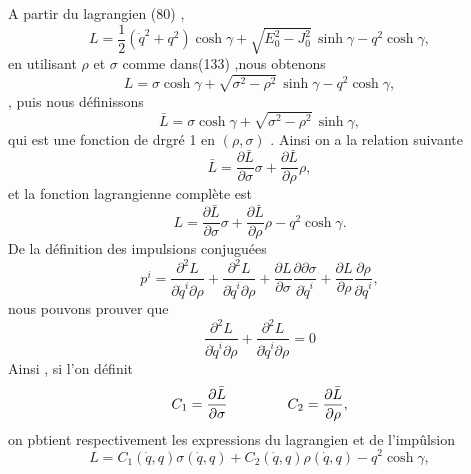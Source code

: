 \documentclass[12pt,a4paper, openany]{article}
\begin{document}
	   A partir du lagrangien (80) ,
	   \begin{equation}  
	   L=\frac{1}{2}\left(\dot{q}^{2}+q^{2}\right)\cosh{\gamma}+\sqrt{E^2_0-J_0^2}\,\sinh{\gamma}-q^{2}\cosh{\gamma},
	\end{equation}
	en utilisant $\rho$ et $\sigma$ comme dans(133) ,nous obtenons
	\begin{equation}  
		L=\sigma\cosh{\gamma}+\sqrt{\sigma^2-\rho^2}\,\sinh{\gamma}-q^{2}\cosh{\gamma},\end{equation},
		puis nous définissons 
		 \begin{equation}  
		 	\bar{L}=\sigma\cosh{\gamma}+\sqrt{\sigma^2-\rho^2}\,\sinh{\gamma},
		 \end{equation}
		 qui est une fonction de drgré 1 en $\left(\rho,\sigma\right)$ . Ainsi on a la relation suivante 
		 \begin{equation}
		 \bar{L}=\frac{\partial{\bar{L}}}{\partial{\sigma}}\sigma+\frac{\partial{\bar{L}}}{\partial{\rho}}\rho ,	
		 \end{equation}
		 et la fonction lagrangienne complète est 
		 \begin{equation}
		 L=\frac{\partial{\bar{L}}}{\partial{\sigma}}\sigma+\frac{\partial{\bar{L}}}{\partial{\rho}}\rho-q^{2}\cosh{\gamma} .	
		 \end{equation}
		 De la définition des impulsions conjuguées 
		 \begin{equation}
		 	p^i=\frac{\partial^{2}L}{\partial \dot{q}^i\partial\rho}+\frac{\partial^{2}L}{\partial \dot{q}^i\partial\rho}+\frac{\partial L}{\partial \sigma}\frac{\partial \partial \sigma}{\partial \dot{q}^i}+\frac{\partial L}{\partial \rho}\frac{\partial \rho}{\partial \dot{q}^i} ,
		 \end{equation}
		 nous pouvons prouver que
		 \begin{equation}
		 \frac{\partial^{2}L}{\partial \dot{q}^i\partial\rho}+\frac{\partial^{2}L}{\partial \dot{q}^i\partial\rho}=0
		\end{equation}
		 Ainsi , si l'on définit 
		 \begin{equation}
		 	C_1=\frac{\partial\bar{L} }{\partial \sigma} \hspace{1.5cm}C_2=\frac{\partial \bar{L}}{\partial \rho},
		 \end{equation}
		 on pbtient respectivement les expressions du lagrangien et de l'impûlsion 
		 \begin{equation}
		 L=C_1(\dot{q}, q )\sigma(\dot{q}, q )+C_2(\dot{q}, q )\rho(\dot{q}, q )-q^{2}\cosh{\gamma},	
		 \end{equation}
\end{document}
